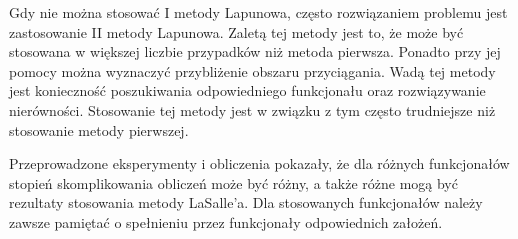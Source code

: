 \documentclass[a4paper,11pt]{article}
\begin{document}
Gdy nie można stosować I metody Lapunowa, często rozwiązaniem problemu jest zastosowanie II metody Lapunowa. Zaletą tej metody jest to, że może być stosowana w większej liczbie przypadków niż metoda pierwsza. Ponadto przy jej pomocy można wyznaczyć przybliżenie obszaru przyciągania. Wadą tej metody jest konieczność poszukiwania odpowiedniego funkcjonału oraz rozwiązywanie nierówności. Stosowanie tej metody jest w związku z tym często trudniejsze niż stosowanie metody pierwszej.

Przeprowadzone eksperymenty i obliczenia pokazały, że dla różnych funkcjonałów stopień skomplikowania obliczeń może być różny, a także różne mogą być rezultaty stosowania metody LaSalle'a. Dla stosowanych funkcjonałów należy zawsze pamiętać o spełnieniu przez funkcjonały odpowiednich założeń.
\end{document}
